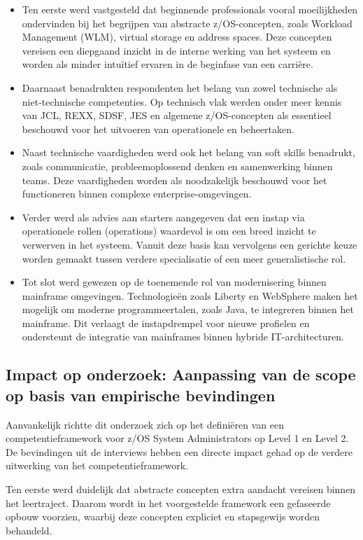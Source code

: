 \begin{itemize}
	\item Ten eerste werd vastgesteld dat beginnende professionals vooral moeilijkheden ondervinden bij het begrijpen van abstracte z/OS-concepten, zoals Workload Management (WLM), virtual storage en address spaces. Deze concepten vereisen een diepgaand inzicht in de interne werking van het systeem en worden als minder intuïtief ervaren in de beginfase van een carrière.
	\item Daarnaast benadrukten respondenten het belang van zowel technische als niet-technische competenties. Op technisch vlak werden onder meer kennis van JCL, REXX, SDSF, JES en algemene z/OS-concepten als essentieel beschouwd voor het uitvoeren van operationele en beheertaken.
	\item Naast technische vaardigheden werd ook het belang van soft skills benadrukt, zoals communicatie, probleemoplossend denken en samenwerking binnen teams. Deze vaardigheden worden als noodzakelijk beschouwd voor het functioneren binnen complexe enterprise-omgevingen.
	\item Verder werd als advies aan starters aangegeven dat een instap via operationele rollen (operations) waardevol is om een breed inzicht te verwerven in het systeem. Vanuit deze basis kan vervolgens een gerichte keuze worden gemaakt tussen verdere specialisatie of een meer generalistische rol.
	\item Tot slot werd gewezen op de toenemende rol van modernisering binnen mainframe omgevingen. Technologieën zoals Liberty en WebSphere maken het mogelijk om moderne programmeertalen, zoals Java, te integreren binnen het mainframe. Dit verlaagt de instapdrempel voor nieuwe profielen en ondersteunt de integratie van mainframes binnen hybride IT-architecturen.
\end{itemize}

\subsection{Impact op onderzoek: Aanpassing van de scope op basis van empirische bevindingen}

Aanvankelijk richtte dit onderzoek zich op het definiëren van een competentieframework voor z/OS System Administrators op Level 1 en Level 2.
De bevindingen uit de interviews hebben een directe impact gehad op de verdere uitwerking van het competentieframework.

Ten eerste werd duidelijk dat abstracte concepten extra aandacht vereisen binnen het leertraject. Daarom wordt in het voorgestelde framework een gefaseerde opbouw voorzien, waarbij deze concepten expliciet en stapsgewijs worden behandeld.

